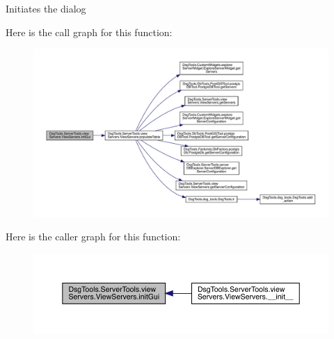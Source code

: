\begin{DoxyVerb}Initiates the dialog
\end{DoxyVerb}
 Here is the call graph for this function\+:
\nopagebreak
\begin{figure}[H]
\begin{center}
\leavevmode
\includegraphics[width=350pt]{class_dsg_tools_1_1_server_tools_1_1view_servers_1_1_view_servers_a3b2e474e4cc3ee41cf86163f98ea5d9c_cgraph}
\end{center}
\end{figure}
Here is the caller graph for this function\+:
\nopagebreak
\begin{figure}[H]
\begin{center}
\leavevmode
\includegraphics[width=350pt]{class_dsg_tools_1_1_server_tools_1_1view_servers_1_1_view_servers_a3b2e474e4cc3ee41cf86163f98ea5d9c_icgraph}
\end{center}
\end{figure}
\mbox{\label{class_dsg_tools_1_1_server_tools_1_1view_servers_1_1_view_servers_a463ce1c1979b98080d1bcbcc1839b8d8}} 
